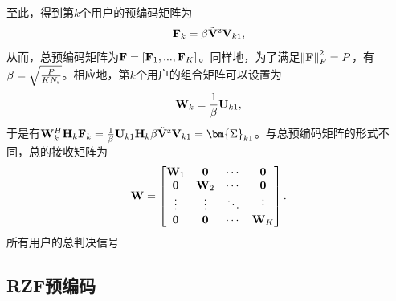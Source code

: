 至此，得到第${k}$个用户的预编码矩阵为
\begin{equation}\label{chap2:eq37}
  {{\bf{F}}_k} = \beta {{\tilde{{\bf{V}}}}^{\rm{z}}}{{\bf{V}}_{k1}},
\end{equation}
从而，总预编码矩阵为${{\bf{F}} = \left[ {{{\bf{F}}_1},...,{{\bf{F}}_K}} \right]}$。同样地，为了满足${\left\| {\bf{F}} \right\|_F^2 = P}$，有 ${\beta  = \sqrt {\frac{P}{{K{N_{\rm{s}}}}}}}$。相应地，第${k}$个用户的组合矩阵可以设置为
\begin{equation}\label{chap2:eq38}
  {{\bf{W}}_k} = \frac{1}{\beta }{{\bf{U}}_{k1}},
\end{equation}
于是有${{\bf{W}}_k^H{{\bf{H}}_k}{{\bf{F}}_k} = \frac{1}{\beta }{{\bf{U}}_{k1}}{{\bf{H}}_k}\beta {{\tilde{{\bf{V}}}}^{\rm{z}}}{{\bf{V}}_{k1}} = {{\bm{\Sigma }}_{k1}}}$。与总预编码矩阵的形式不同，总的接收矩阵为
\begin{equation}\label{chap2:eq39}
  {\bf{W}} = \begin{bmatrix}
               {{{\bf{W}}_1}}&{\bf{0}}& \cdots &{\bf{0}} \\
               {\bf{0}}&{{{\bf{W}}_2}}& \cdots &{\bf{0}} \\
                \vdots & \vdots & \ddots & \vdots \\
               {\bf{0}}&{\bf{0}}& \cdots &{{{\bf{W}}_K}}
             \end{bmatrix}.
\end{equation}
所有用户的总判决信号

\subsection{RZF预编码}

